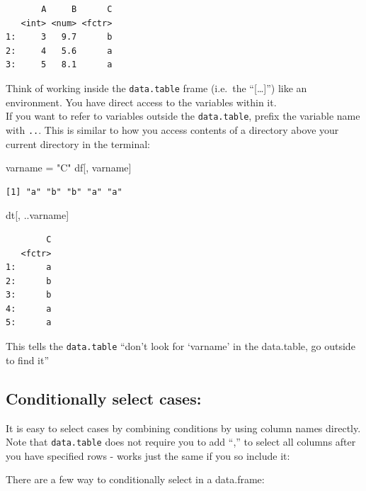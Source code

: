 \documentclass[
]{book}
\newenvironment{Shaded}{\begin{snugshade}}{\end{snugshade}}
\newcommand{\NormalTok}[1]{#1}
\newcommand{\OtherTok}[1]{\textcolor[rgb]{0.56,0.35,0.01}{#1}}
\newcommand{\StringTok}[1]{\textcolor[rgb]{0.31,0.60,0.02}{#1}}
\begin{document}
\begin{verbatim}
       A     B      C
   <int> <num> <fctr>
1:     3   9.7      b
2:     4   5.6      a
3:     5   8.1      a
\end{verbatim}

Think of working inside the \texttt{data.table} frame (i.e.~the ``{[}\ldots{]}'') like an environment. You have direct access to the variables within it.\\
If you want to refer to variables outside the \texttt{data.table}, prefix the variable name with \texttt{..}. This is similar to how you access contents of a directory above your current directory in the terminal:

\begin{Shaded}
\begin{Highlighting}[]
\NormalTok{varname }\OtherTok{=} \StringTok{"C"}
\NormalTok{df[, varname]}
\end{Highlighting}
\end{Shaded}

\begin{verbatim}
[1] "a" "b" "b" "a" "a"
\end{verbatim}

\begin{Shaded}
\begin{Highlighting}[]
\NormalTok{dt[, ..varname]}
\end{Highlighting}
\end{Shaded}

\begin{verbatim}
        C
   <fctr>
1:      a
2:      b
3:      b
4:      a
5:      a
\end{verbatim}

This tells the \texttt{data.table} ``don't look for `varname' in the data.table, go outside to find it''

\hypertarget{conditionally-select-cases}{%
\subsection{Conditionally select cases:}\label{conditionally-select-cases}}

It is easy to select cases by combining conditions by using column names directly. Note that \texttt{data.table} does not require you to add ``,'' to select all columns after you have specified rows - works just the same if you so include it:

There are a few way to conditionally select in a data.frame:
\end{document}
